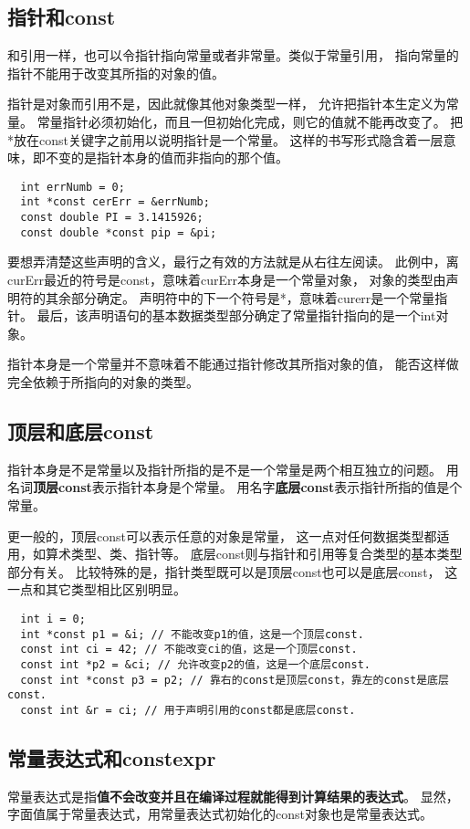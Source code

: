 \subsection{指针和const}
和引用一样，也可以令指针指向常量或者非常量。类似于常量引用，%
指向常量的指针不能用于改变其所指的对象的值。%
\par
指针是对象而引用不是，因此就像其他对象类型一样，%
允许把指针本生定义为常量。%
常量指针必须初始化，而且一但初始化完成，则它的值就不能再改变了。%
把*放在const关键字之前用以说明指针是一个常量。%
这样的书写形式隐含着一层意味，即不变的是指针本身的值而非指向的那个值。%
\begin{lstlisting}
  int errNumb = 0;
  int *const cerErr = &errNumb;
  const double PI = 3.1415926;
  const double *const pip = &pi;
\end{lstlisting}
要想弄清楚这些声明的含义，最行之有效的方法就是从右往左阅读。%
此例中，离curErr最近的符号是const，意味着curErr本身是一个常量对象，%
对象的类型由声明符的其余部分确定。%
声明符中的下一个符号是*，意味着curerr是一个常量指针。%
最后，该声明语句的基本数据类型部分确定了常量指针指向的是一个int对象。%
\par
指针本身是一个常量并不意味着不能通过指针修改其所指对象的值，%
能否这样做完全依赖于所指向的对象的类型。%
\subsection{顶层和底层const}
指针本身是不是常量以及指针所指的是不是一个常量是两个相互独立的问题。%
用名词{\bfseries{顶层const}}表示指针本身是个常量。%
用名字{\bfseries{底层const}}表示指针所指的值是个常量。
\par
更一般的，顶层const可以表示任意的对象是常量，%
这一点对任何数据类型都适用，如算术类型、类、指针等。%
底层const则与指针和引用等复合类型的基本类型部分有关。%
比较特殊的是，指针类型既可以是顶层const也可以是底层const，%
这一点和其它类型相比区别明显。
\begin{lstlisting}
  int i = 0;
  int *const p1 = &i; // 不能改变p1的值，这是一个顶层const.
  const int ci = 42; // 不能改变ci的值，这是一个顶层const.
  const int *p2 = &ci; // 允许改变p2的值，这是一个底层const.
  const int *const p3 = p2; // 靠右的const是顶层const，靠左的const是底层const.
  const int &r = ci; // 用于声明引用的const都是底层const.
\end{lstlisting}
\subsection{常量表达式和constexpr}
常量表达式是指{\bfseries{值不会改变并且在编译过程就能得到计算结果的表达式}}。%
显然，字面值属于常量表达式，用常量表达式初始化的const对象也是常量表达式。%
